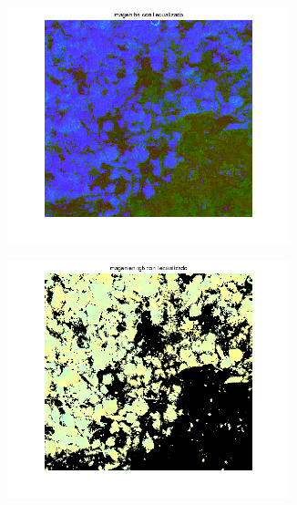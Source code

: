 \documentclass{article}
\begin{document}
\begin{figure}[H]
	\begin{subfigure}{0.5\textwidth}
	\centering
        \includegraphics[width=0.9\textwidth]{1892xxx-hsi-i-ecualizado.png}
    \end{subfigure}\hfill
	\begin{subfigure}{0.5\textwidth}
	\centering
        \includegraphics[width=0.9\textwidth]{1892xxx-rgb-i-ecualizado.png}
    \end{subfigure}\hfill
\end{figure}

\subsection{}
\end{document}
